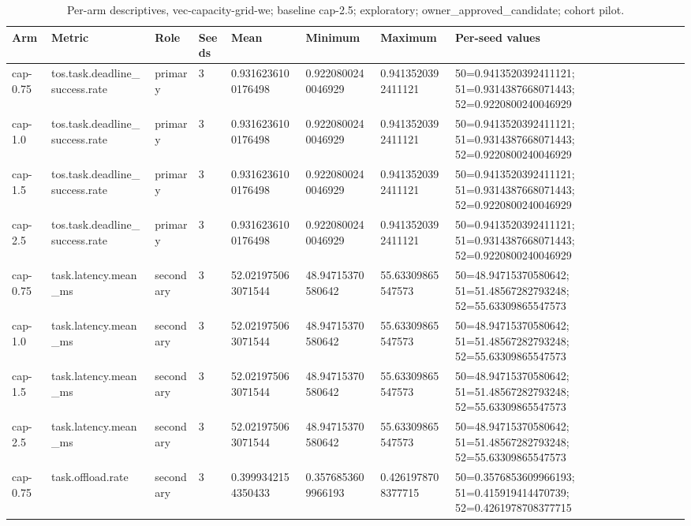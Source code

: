{
\begin{table}[htbp]
\centering
\caption{Per-arm descriptives, vec-capacity-grid-we; baseline cap-2.5; exploratory; owner\_approved\_candidate; cohort pilot.}
\label{tab:traffictwin-metrics-faf29f0cd553}
\small
\renewcommand{\arraystretch}{1.15}
\begin{tabular}{llllllll}
\hline
Arm & Metric & Role & Seeds & Mean & Minimum & Maximum & Per-seed values \\
\hline
cap-0.75 & tos.task.deadline\_success.rate & primary & 3 & 0.9316236100176498 & 0.9220800240046929 & 0.9413520392411121 & 50=0.9413520392411121; 51=0.9314387668071443; 52=0.9220800240046929 \\
cap-1.0 & tos.task.deadline\_success.rate & primary & 3 & 0.9316236100176498 & 0.9220800240046929 & 0.9413520392411121 & 50=0.9413520392411121; 51=0.9314387668071443; 52=0.9220800240046929 \\
cap-1.5 & tos.task.deadline\_success.rate & primary & 3 & 0.9316236100176498 & 0.9220800240046929 & 0.9413520392411121 & 50=0.9413520392411121; 51=0.9314387668071443; 52=0.9220800240046929 \\
cap-2.5 & tos.task.deadline\_success.rate & primary & 3 & 0.9316236100176498 & 0.9220800240046929 & 0.9413520392411121 & 50=0.9413520392411121; 51=0.9314387668071443; 52=0.9220800240046929 \\
cap-0.75 & task.latency.mean\_ms & secondary & 3 & 52.021975063071544 & 48.94715370580642 & 55.63309865547573 & 50=48.94715370580642; 51=51.48567282793248; 52=55.63309865547573 \\
cap-1.0 & task.latency.mean\_ms & secondary & 3 & 52.021975063071544 & 48.94715370580642 & 55.63309865547573 & 50=48.94715370580642; 51=51.48567282793248; 52=55.63309865547573 \\
cap-1.5 & task.latency.mean\_ms & secondary & 3 & 52.021975063071544 & 48.94715370580642 & 55.63309865547573 & 50=48.94715370580642; 51=51.48567282793248; 52=55.63309865547573 \\
cap-2.5 & task.latency.mean\_ms & secondary & 3 & 52.021975063071544 & 48.94715370580642 & 55.63309865547573 & 50=48.94715370580642; 51=51.48567282793248; 52=55.63309865547573 \\
cap-0.75 & task.offload.rate & secondary & 3 & 0.3999342154350433 & 0.3576853609966193 & 0.4261978708377715 & 50=0.3576853609966193; 51=0.415919414470739; 52=0.4261978708377715 \\

\end{tabular}
\end{table}}
